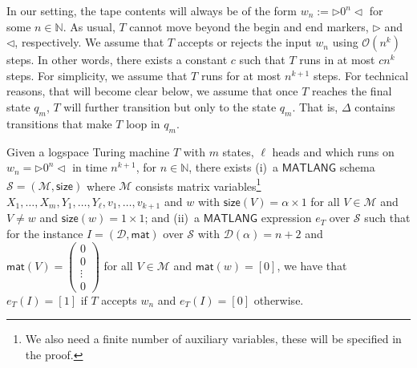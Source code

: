 In our setting, the tape contents will always be of the form $w_n:=\rhd 0^n \lhd$ for some $n\in\mathbb{N}$. As usual, $T$ cannot move beyond the begin and end markers, $\rhd$ and $\lhd$, respectively. We assume that $T$ accepts or rejects the input $w_n$ using $\mathcal{O}(n^k)$ steps. In other words, there exists a constant $c$ such that $T$ runs in at most $cn^k$ steps. For simplicity, we assume that $T$ runs for at most $n^{k+1}$ steps. For technical reasons, that will become clear below, we assume that once $T$ reaches the final state $q_m$, $T$ will further transition but only to the state $q_m$. That is, $\Delta$ contains transitions that make $T$ loop in $q_m$.

\begin{proposition}
Given a logspace Turing machine $T$ with $m$ states, $\ell$ heads and which runs on $w_n=\rhd 0^n \lhd$ in time $n^{k+1}$, for $n\in\mathbb{N}$, there exists (i)~a $\mathsf{MATLANG}$ 
schema $\mathcal{S}=(\mathcal{M},\textsf{size})$ where $\mathcal{M}$ consists matrix variables\footnote{We also need a finite number of auxiliary variables, these will be specified in the proof.} $X_1,\ldots,X_m,Y_1,\ldots,Y_\ell, v_1,\ldots,v_{k+1}$ and $w$ with
$\mathsf{size}(V)=\alpha\times 1$ for all $V\in\mathcal{M}$ and $V\neq w$ and $\mathsf{size}(w)=1\times 1$; and (ii)~a $\mathsf{MATLANG}$ expression $e_T$ over $\mathcal{S}$ such that for the instance $I=(\mathcal{D},\textsf{mat})$ over $\mathcal{S}$ with $\mathcal{D}(\alpha)=n+2$ and $\mathsf{mat}(V)=\left(\begin{smallmatrix}0\\
0\\\vdots\\0\end{smallmatrix}\right)$ for all $V\in\mathcal{M}$ and
$\mathsf{mat}(w)=[0]$, we have that 
$e_T(I)=[1]$ if $T$ accepts $w_n$ and  $e_T(I)=[0]$ otherwise.
\end{proposition}
